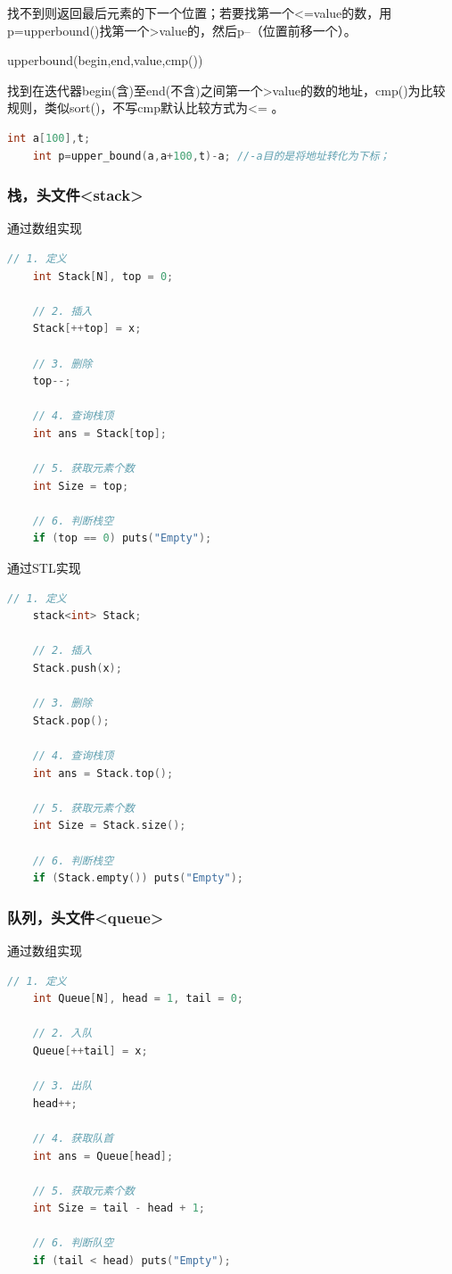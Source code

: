 \documentclass[UTF8]{ctexart}
\begin{document}
找不到则返回最后元素的下一个位置；若要找第一个<=value的数，用p=upper\textunderscore bound()找第一个>value的，然后p--（位置前移一个）。

upper\textunderscore bound(begin,end,value,cmp())

找到在迭代器begin(含)至end(不含)之间第一个>value的数的地址，cmp()为比较规则，类似sort()，不写cmp默认比较方式为<= 。
\begin{lstlisting}[language = C,basicstyle=\small\ttfamily]
    int a[100],t;
    int p=upper_bound(a,a+100,t)-a; //-a目的是将地址转化为下标；
\end{lstlisting}

\subsubsection{栈，头文件<stack>}
通过数组实现
\begin{lstlisting}[language=C++]
	// 1. 定义
	int Stack[N], top = 0;
	
	// 2. 插入
	Stack[++top] = x;
	
	// 3. 删除
	top--;
	
	// 4. 查询栈顶
	int ans = Stack[top];
	
	// 5. 获取元素个数
	int Size = top;
	
	// 6. 判断栈空
	if (top == 0) puts("Empty");
	\end{lstlisting}

	通过STL实现
	\begin{lstlisting}[language=C++]
	// 1. 定义
	stack<int> Stack;
	
	// 2. 插入
	Stack.push(x);
	
	// 3. 删除
	Stack.pop();
	
	// 4. 查询栈顶
	int ans = Stack.top();
	
	// 5. 获取元素个数
	int Size = Stack.size();
	
	// 6. 判断栈空
	if (Stack.empty()) puts("Empty");
	\end{lstlisting}
	


\subsubsection{队列，头文件<queue>}
通过数组实现
\begin{lstlisting}[language=C++]
	// 1. 定义
	int Queue[N], head = 1, tail = 0;
	
	// 2. 入队
	Queue[++tail] = x;
	
	// 3. 出队
	head++;
	
	// 4. 获取队首
	int ans = Queue[head];
	
	// 5. 获取元素个数
	int Size = tail - head + 1;
	
	// 6. 判断队空
	if (tail < head) puts("Empty");
	\end{lstlisting}
	
\end{document}
